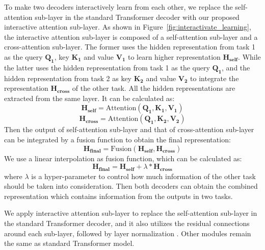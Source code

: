 \documentclass[letterpaper]{article} %
\begin{document}
To make two decoders interactively learn from each other, we replace the self-attention sub-layer in the standard Transformer decoder with our proposed interactive attention sub-layer.
As shown in Figure~\ref{fig:interactivate_learning}, the interactive attention sub-layer is composed of a self-attention sub-layer and a cross-attention sub-layer. The former uses the hidden representation from task 1 as the query $\mathbf{Q_1}$, key $\mathbf{K_1}$ and value $\mathbf{V_1}$ to learn higher representation $\mathbf{H_{self}}$. While the latter uses the hidden representation from task 1 as the query $\mathbf{Q_1}$, and the hidden representation from task 2 as key $\mathbf{K_2}$ and value $\mathbf{V_2}$ to integrate the representation $\mathbf{H_{cross}}$ of the other task. All the hidden representations are extracted from the same layer. It can be calculated as:
\begin{equation}
\mathbf{H_{self}}=\mathrm{Attention(\mathbf{Q_1},\mathbf{K_1},\mathbf{V_1})}
\end{equation}
\begin{equation}
\mathbf{H_{cross}}=\mathrm{Attention(\mathbf{Q_1},\mathbf{K_2},\mathbf{V_2})}
\end{equation}
Then the output of self-attention sub-layer and that of cross-attention sub-layer can be integrated by a fusion function to obtain the final representation:
\begin{equation}
\mathbf{H_{final}}=\mathrm{Fusion(\mathbf{H_{self}},\mathbf{H_{cross}})}
\end{equation}
We use a linear interpolation as fusion function, which can be calculated as:
\begin{equation}
\mathbf{H_{final}}=\mathbf{H_{self}} + \lambda * \mathbf{H_{cross}}
\end{equation}
where $\lambda$ is a hyper-parameter to control how much information of the other task should be taken into consideration.
Then both decoders can obtain the combined representation which contains information from the  outputs in two tasks.

We apply interactive attention sub-layer to replace the self-attention sub-layer in the standard Transformer decoder, and it also utilizes the residual connections \cite{he2016deep} around each sub-layer, followed by layer normalization \cite{ba2016layer}.
Other modules remain the same as standard Transformer model.
\end{document}

